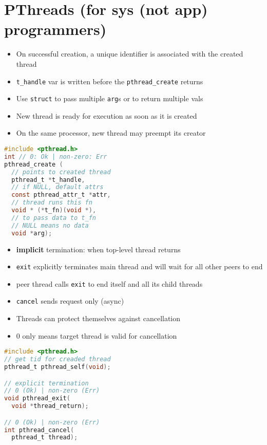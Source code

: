 \section*{PThreads (for sys (not app) programmers)}
\begin{minipage}{0.5\linewidth}
  \flushleft
  \begin{itemize}
  \item On successful creation, a unique identifier is associated with the created thread
  \item \texttt{t\_handle} var is written before the \texttt{pthread\_create} returns
  \item Use \texttt{struct} to pass multiple \texttt{arg}s or to return multiple vals
  \item New thread is ready for execution as soon as it is created
  \item On the same processor, new thread may preempt its creator
  \end{itemize}
\end{minipage}
\begin{minipage}{0.5\linewidth}
\begin{lstlisting}[language=C,xleftmargin=1pt,xrightmargin=2pt]
#include <pthread.h>
int // 0: Ok | non-zero: Err
pthread_create (
  // points to created thread
  pthread_t *t_handle,
  // if NULL, default attrs
  const pthread_attr_t *attr,
  // thread runs this fn
  void * (*t_fn)(void *),
  // to pass data to t_fn
  // NULL means no data
  void *arg);
\end{lstlisting}
\end{minipage}
\begin{minipage}{0.5\linewidth}
  \flushleft
  \begin{itemize}
  \item \textbf{implicit} termination: when top-level thread returns
  \item \texttt{exit} explicitly terminates main thread and will wait for all other peers to end
  \item peer thread calls \texttt{exit} to end itself and all its child threads
  \item \texttt{cancel} sends request only (async)
  \item Threads can protect themselves against cancellation
  \item 0 only means target thread is valid for cancellation
  \end{itemize}
\end{minipage}
\begin{minipage}{0.5\linewidth}
\begin{lstlisting}[language=C,xleftmargin=1pt,xrightmargin=2pt]
#include <pthread.h>
// get tid for creaded thread
pthread_t pthread_self(void);

// explicit termination
// 0 (Ok) | non-zero (Err)
void pthread_exit(
  void *thread_return);

// 0 (Ok) | non-zero (Err)
int pthread_cancel(
  pthread_t thread);
\end{lstlisting}
\end{minipage}


